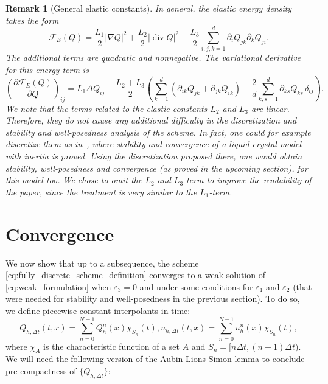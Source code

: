 \documentclass[10pt,letterpaper]{amsart}
\newcommand{\Grad}{\nabla}
\newcommand{\Div}{\operatorname{div}}
\newtheorem{remark}[lemma]{Remark}
\theoremstyle{definition}{\newtheorem{definition}[lemma]{Definition}}
\theoremstyle{note}{\newtheorem{claim}{Claim}[section]
\newtheorem*{claim*}{Claim}}
\numberwithin{equation}{section}
\begin{document}
\begin{remark}[General elastic constants]
	In general, the elastic energy density takes the form 
	\begin{equation*}
		\mathcal{F}_E(Q) = \frac{L_1}{2}|\Grad Q|^2 + \frac{L_2}{2}|\Div Q|^2 +\frac{L_3}{2}\sum_{i,j,k=1}^d \partial_i Q_{jk}\partial_k Q_{ji}.
	\end{equation*}
	The additional terms are quadratic and nonnegative.
	The variational derivative for this energy term is
	\begin{equation*}
		\left(\frac{\partial \mathcal{F}_E(Q)}{\partial Q}\right)_{ij} = L_1 \Delta Q_{ij} + \frac{L_2+L_3}{2} \left(\sum_{k=1}^d\left( \partial_{ik}Q_{jk} + \partial_{jk}Q_{ik}\right) - \frac{2}{d} \sum_{k,s=1}^d \partial_{ks}Q_{ks}\, \delta_{ij}\right).
	\end{equation*}
	We note that the terms related to the elastic constants $L_2$ and $L_3$ are linear. Therefore, they do not cause any additional difficulty in the discretization and stability and well-posedness analysis of the scheme. In fact, one could for example discretize them as in~\cite{Hirsch2024}, where stability and convergence of a liquid crystal model with inertia is proved. Using the discretization proposed there, one would obtain stability, well-posedness and convergence (as proved in the upcoming section), for this model too. We chose to omit the $L_2$ and $L_3$-term to improve the readability of the paper, since the treatment is very similar to the $L_1$-term.	
\end{remark}
\section{Convergence}\label{sec:conv}
We now show that up to a subsequence, the scheme \eqref{eq:fully_discrete_scheme_definition} converges to a weak solution of \eqref{eq:weak_formulation} when $\varepsilon_3=0$ and under some conditions for $\varepsilon_1$ and $\varepsilon_2$ (that were needed for stability and well-posedness in the previous section). To do so, we define piecewise constant interpolants in time:
\begin{subequations}
    \begin{equation}
        Q_{h,\Delta t}(t, x) = \sum_{n=0}^{N-1} Q_{h}^n(x)\chi_{S_n}(t),
    \end{equation}
    \begin{equation}
        u_{h,\Delta t}(t, x) = \sum_{n=0}^{N-1} u_{h}^n(x)\chi_{S_n}(t),
    \end{equation}
\end{subequations}
where $\chi_A$ is the characteristic function of a set $A$ and $S_n = [n\Delta t, (n+1)\Delta t)$. We will need the following version of the Aubin-Lions-Simon lemma to conclude pre-compactness of $\{Q_{h,\Delta t}\}$:
\end{document}
